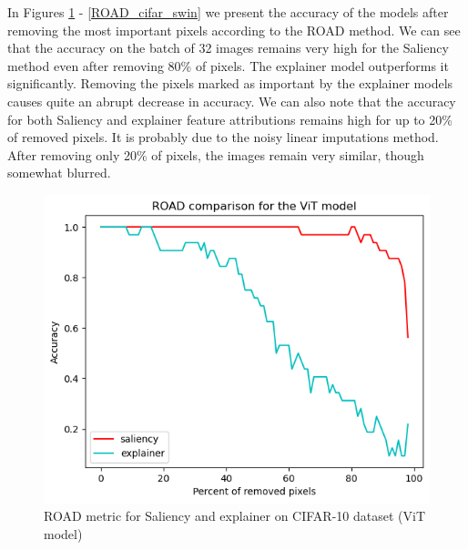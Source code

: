 \documentclass[magisterska,en]{pracamgr}
\begin{document}
In Figures \ref{ROAD_cifar_vit} - \ref{ROAD_cifar_swin} we present the accuracy of the models after removing the most important pixels according to the ROAD method. We can see that the accuracy on the batch of 32 images remains very high for the Saliency method even after removing 80\% of pixels. The explainer model outperforms it significantly. Removing the pixels marked as important by the explainer models causes quite an abrupt decrease in accuracy. We can also note that the accuracy for both Saliency and explainer feature attributions remains high for up to 20\% of removed pixels. It is probably due to the noisy linear imputations method. After removing only 20\% of pixels, the images remain very similar, though somewhat blurred.



\begin{figure}[H]
\centering
\includegraphics[scale=0.6]{./images/ROAD_cifar_vit.png}
\caption{ROAD metric for Saliency and explainer on CIFAR-10 dataset (ViT model)}
\label{ROAD_cifar_vit}
\end{figure}
\end{document}
